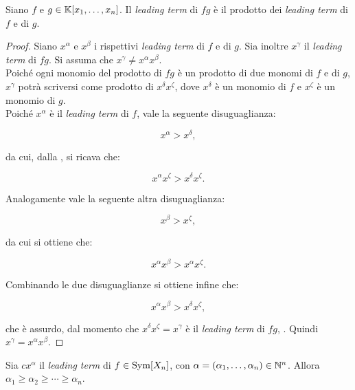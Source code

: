 \documentclass[11pt]{scrbook}
\begin{document}
\begin{proposition}
    \label{prop:leading_term_prodotto}

    Siano $f$ e $g \in \mathbb{K}[x_1, \ldots, x_n]$.
    Il \textit{leading term} di $fg$ è il
    prodotto dei \textit{leading term} di $f$ e di $g$.
\end{proposition}

\begin{proof}
    Siano $x^\alpha$ e $x^\beta$ i rispettivi \textit{leading term}
    di $f$ e di $g$. Sia inoltre $x^\gamma$ il \textit{leading term}
    di $fg$. Si assuma che $x^\gamma \neq x^\alpha x^\beta$. \\
    
    Poiché ogni monomio del prodotto di $fg$ è un prodotto di due
    monomi di $f$ e di $g$, $x^\gamma$ potrà scriversi come
    prodotto di $x^\delta x^\zeta$, dove $x^\delta$ è un monomio
    di $f$ e $x^\zeta$ è un monomio di $g$. \\
    
    Poiché $x^\alpha$ è il \textit{leading term} di $f$, vale
    la seguente disuguaglianza:
    
    \[ x^\alpha > x^\delta, \]
    
    \vskip 0.1in
    
    da cui, dalla , si
    ricava che:
    
    \[ x^\alpha x^\zeta > x^\delta x^\zeta. \]
    
    \vskip 0.1in
    
    Analogamente vale la seguente altra disuguaglianza:
    
    \[ x^\beta > x^\zeta, \]
    
    \vskip 0.1in
    
    da cui si ottiene che:
    
    \[ x^\alpha x^\beta > x^\alpha x^\zeta. \]
    
    \vskip 0.1in
    
    Combinando le due disuguaglianze si ottiene infine che:
    
    \[ x^\alpha x^\beta > x^\delta x^\zeta, \]
    
    \vskip 0.1in
    
    che è assurdo, dal momento che $x^\delta x^\zeta = x^\gamma$ è il \textit{leading
    term} di $fg$, \Lightning{}. Quindi $x^\gamma = x^\alpha x^\beta$.
\end{proof}

\begin{lemma}
    \label{lem:leading_term_simmetrico_disuguaglianza}
    Sia $c x^\alpha$ il \textit{leading term}
    di $f \in \operatorname{Sym}[X_n]$, con $\alpha = (\alpha_1, \ldots, \alpha_n) \in \mathbb N^n$.
    Allora $\alpha_1 \geq \alpha_2 \geq \cdots \geq \alpha_n$.
\end{lemma}
\end{document}
